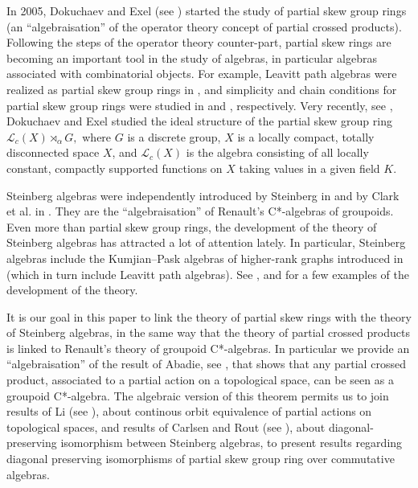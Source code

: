 \documentclass[11pt, a4paper]{amsart}
\newcommand{\G}{\ensuremath {\mathcal{G}}}
\newcommand{\Lc}{\ensuremath {\mathcal{L}_c(X)}}
\newcommand{\Lg}{\ensuremath {\mathcal{L}_c(X)\rtimes_{\alpha} G}}
\theoremstyle{plain}
\begin{document}
In 2005, Dokuchaev and Exel (see \cite{Dokuchaev1}) started the study of partial skew group rings (an “algebraisation” of the operator theory concept of partial crossed products). Following the steps of the operator theory counter-part, partial skew rings are becoming an important tool in the study of algebras, in particular algebras associated with combinatorial objects. For example, Leavitt path algebras were realized as partial skew group rings in \cite{Goncalves}, and simplicity and chain conditions for partial skew group rings were studied in \cite{GoncalvesCMB, GR} and \cite{OinertChain}, respectively. Very recently, see \cite{Dokuchaev}, Dokuchaev and Exel studied the ideal structure of the partial skew group ring $\Lg,$ where $G$ is a discrete group, $X$ is a locally compact, totally disconnected space $X$, and $\Lc$ is the algebra consisting of all locally constant, compactly supported functions on $X$ taking values in a given field $K.$  


Steinberg algebras were independently introduced by Steinberg in \cite{Steinberg} and by Clark et al. in \cite{Clark1}. 
They are the “algebraisation” of Renault's C*-algebras of groupoids. Even more than partial skew group rings, the development of the theory of Steinberg algebras has attracted a lot of attention lately. In particular, Steinberg algebras include the Kumjian–Pask algebras of higher-rank graphs introduced in \cite{Aranda} (which in turn include Leavitt path algebras). See \cite{Clark}, \cite{Clark3} and \cite{Steinberg2} for a few examples of the development of the theory. 

It is our goal in this paper to link the theory of partial skew rings with the theory of Steinberg algebras, in the same way that the theory of partial crossed products is linked to Renault's theory of groupoid C*-algebras. In particular we provide an “algebraisation” of the result of Abadie, see \cite{Abadie}, that shows that any partial crossed product, associated to a partial action on a topological space, can be seen as a groupoid C*-algebra. The algebraic version of this theorem permits us to join results of Li (see \cite{Xin}), about continous orbit equivalence of partial actions on topological spaces, and results of Carlsen and Rout (see \cite{James}), about %
diagonal-preserving isomorphism between Steinberg algebras, to present results regarding diagonal preserving isomorphisms of partial skew group ring over commutative algebras. 
\end{document}
